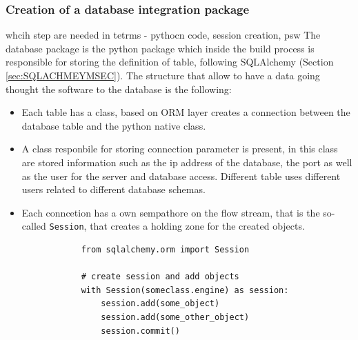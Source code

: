 \documentclass[../main.tex]{subfiles}
\begin{document}
\subsubsection{Creation of a database integration package}
whcih step are needed in tetrms - pythocn code, session creation, psw
The database package is the python package which inside the build process is responsible for storing the definition of table, following SQLAlchemy (Section \ref{sec:SQLACHMEYMSEC}).
The structure that allow to have a data going thought the software to the database is the following:
\begin{itemize}
    \item Each table has a class, based on \gls{ORM} layer creates a connection between the database table and the python native class. 
    \item A class responbile for storing connection parameter is present, in this class are stored information such as the ip address of the database, the port as well as the user for the server and database access. Different table uses different users related to different database schemas. 
    \item Each conncetion has a own sempathore on the flow stream, that is the so-called \texttt{Session}, that creates a holding zone for the created objects. 
        \lstset{language=Python}
        \lstset{frame=lines}
        \lstset{basicstyle=\footnotesize}
        \begin{lstlisting}
            from sqlalchemy.orm import Session
            
            # create session and add objects
            with Session(someclass.engine) as session:
                session.add(some_object)
                session.add(some_other_object)
                session.commit()
        \end{lstlisting}
\end{itemize}
\end{document}
